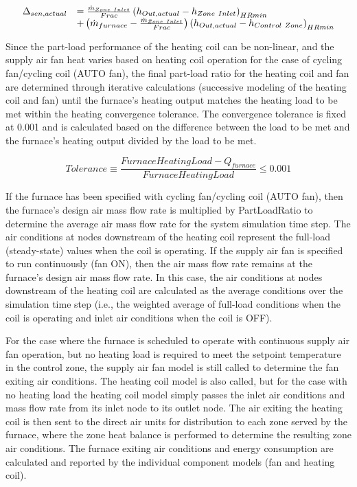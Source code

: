\begin{equation}
  \begin{array}{rl}
    \Delta_{sen,actual} &= \frac{\dot{m}_{Zone~Inlet}}{Frac} \left(h_{Out,actual} - h_{Zone~Inlet}\right)_{HRmin} \\
                           &+ \left(\dot{m}_{furnace} - \frac{\dot{m}_{Zone~Inlet}}{Frac}\right) \left(h_{Out,actual} - h_{Control~Zone}\right)_{HRmin}
  \end{array}
\end{equation}

Since the part-load performance of the heating coil can be non-linear, and the supply air fan heat varies based on heating coil operation for the case of cycling fan/cycling coil (AUTO fan), the final part-load ratio for the heating coil and fan are determined through iterative calculations (successive modeling of the heating coil and fan) until the furnace's heating output matches the heating load to be met within the heating convergence tolerance. The convergence tolerance is fixed at 0.001 and is calculated based on the difference between the load to be met and the furnace's heating output divided by the load to be met.

\begin{equation}
  Tolerance \equiv \frac{FurnaceHeatingLoad - Q_{furnace}}{FurnaceHeatingLoad} \leq 0.001
\end{equation}

If the furnace has been specified with cycling fan/cycling coil (AUTO fan), then the furnace's design air mass flow rate is multiplied by PartLoadRatio to determine the average air mass flow rate for the system simulation time step. The air conditions at nodes downstream of the heating coil represent the full-load (steady-state) values when the coil is operating. If the supply air fan is specified to run continuously (fan ON), then the air mass flow rate remains at the furnace's design air mass flow rate. In this case, the air conditions at nodes downstream of the heating coil are calculated as the average conditions over the simulation time step (i.e., the weighted average of full-load conditions when the coil is operating and inlet air conditions when the coil is OFF).

For the case where the furnace is scheduled to operate with continuous supply air fan operation, but no heating load is required to meet the setpoint temperature in the control zone, the supply air fan model is still called to determine the fan exiting air conditions. The heating coil model is also called, but for the case with no heating load the heating coil model simply passes the inlet air conditions and mass flow rate from its inlet node to its outlet node. The air exiting the heating coil is then sent to the direct air units for distribution to each zone served by the furnace, where the zone heat balance is performed to determine the resulting zone air conditions. The furnace exiting air conditions and energy consumption are calculated and reported by the individual component models (fan and heating coil).

